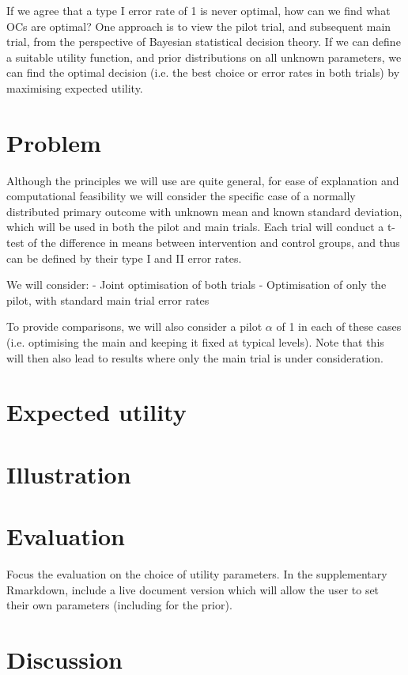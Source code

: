 \documentclass[sagev]{sagej}
\begin{document}
If we agree that a type I error rate of 1 is never optimal, how can we find what OCs are optimal? One approach is to view the pilot trial, and subsequent main trial, from the perspective of Bayesian statistical decision theory. If we can define a suitable utility function, and prior distributions on all unknown parameters, we can find the optimal decision (i.e. the best choice or error rates in both trials) by maximising expected utility.
 
\section{Problem}

Although the principles we will use are quite general, for ease of explanation and computational feasibility we will consider the specific case of a normally distributed primary outcome with unknown mean and known standard deviation, which will be used in both the pilot and main trials. Each trial will conduct a t-test of the difference in means between intervention and control groups, and thus can be defined by their type I and II error rates.  

We will consider:
- Joint optimisation of both trials
- Optimisation of only the pilot, with standard main trial error rates

To provide comparisons, we will also consider a pilot $\alpha$ of 1 in each of these cases (i.e. optimising the main and keeping it fixed at typical levels). Note that this will then also lead to results where only the main trial is under consideration.
 
\section{Expected utility}

\section{Illustration}

\section{Evaluation}

Focus the evaluation on the choice of utility parameters. In the supplementary Rmarkdown, include a live document version which will allow the user to set their own parameters (including for the prior).

\section{Discussion}
\end{document}
